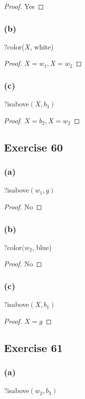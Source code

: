 \documentclass[14pt]{extarticle}
\begin{document}
\begin{proof}
Yes
\end{proof}

\subsubsection{(b)}
?color($X$, white)

\begin{proof}
$X = w_1, X = w_2$
\end{proof}

\subsubsection{(c)}
?isabove$(X, b_3)$

\begin{proof}
$X = b_2, X = w_2$
\end{proof}

\subsection{Exercise 60}

\subsubsection{(a)}
?isabove$(w_1, g)$

\begin{proof}
No
\end{proof}

\subsubsection{(b)}
?color$(w_2$, blue)

\begin{proof}
No
\end{proof}

\subsubsection{(c)}
?isabove$(X, b_1)$

\begin{proof}
$X = g$
\end{proof}

\subsection{Exercise 61}

\subsubsection{(a)}
?isabove$(w_2, b_3)$
\end{document}
